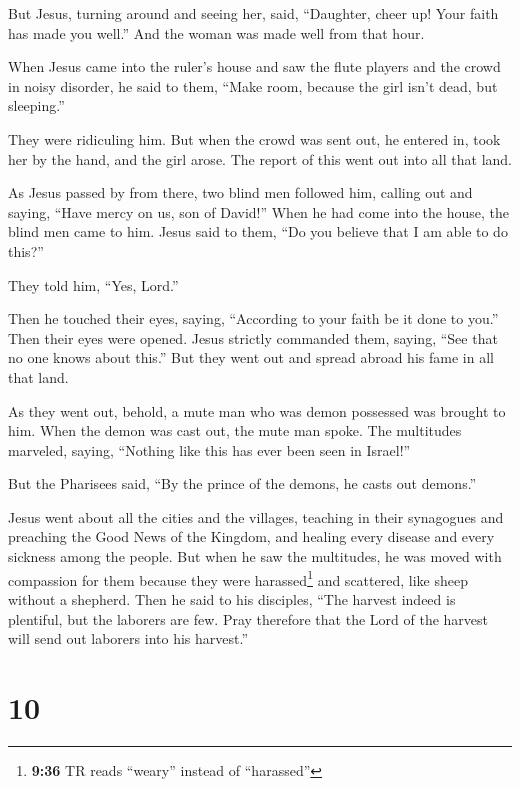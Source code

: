  But Jesus, turning around and seeing her, said,
``Daughter, cheer up! Your faith has made you well.'' And the woman was
made well from that hour.

 When Jesus came into the ruler's house and saw the flute
players and the crowd in noisy disorder,  he said to
them, ``Make room, because the girl isn't dead, but sleeping.''

They were ridiculing him.  But when the crowd was sent
out, he entered in, took her by the hand, and the girl arose.
 The report of this went out into all that land.

 As Jesus passed by from there, two blind men followed
him, calling out and saying, ``Have mercy on us, son of David!''
 When he had come into the house, the blind men came to
him. Jesus said to them, ``Do you believe that I am able to do this?''

They told him, ``Yes, Lord.''

 Then he touched their eyes, saying, ``According to your
faith be it done to you.''  Then their eyes were opened.
Jesus strictly commanded them, saying, ``See that no one knows about
this.''  But they went out and spread abroad his fame in
all that land.

 As they went out, behold, a mute man who was demon
possessed was brought to him.  When the demon was cast
out, the mute man spoke. The multitudes marveled, saying, ``Nothing like
this has ever been seen in Israel!''

 But the Pharisees said, ``By the prince of the demons,
he casts out demons.''

 Jesus went about all the cities and the villages,
teaching in their synagogues and preaching the Good News of the Kingdom,
and healing every disease and every sickness among the people.
 But when he saw the multitudes, he was moved with
compassion for them because they were harassed\footnote{\textbf{9:36} TR
  reads ``weary'' instead of ``harassed''} and scattered, like sheep
without a shepherd.  Then he said to his disciples, ``The
harvest indeed is plentiful, but the laborers are few. 
Pray therefore that the Lord of the harvest will send out laborers into
his harvest.''

\hypertarget{section-9}{%
\section{10}\label{section-9}}

